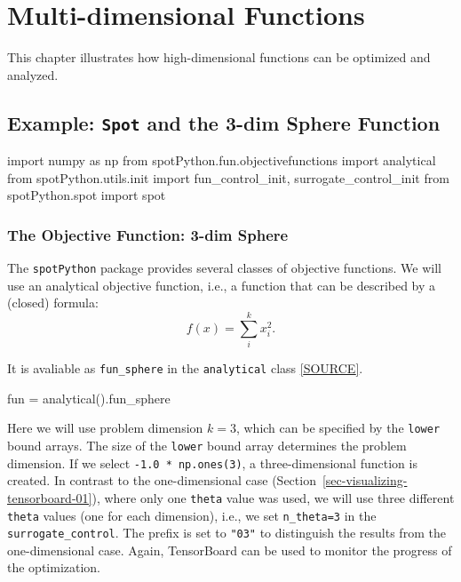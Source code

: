 \documentclass[
  letterpaper,
  DIV=11,
  numbers=noendperiod]{scrreprt}
\newenvironment{Shaded}{\begin{snugshade}}{\end{snugshade}}
\newcommand{\ImportTok}[1]{\textcolor[rgb]{0.00,0.46,0.62}{#1}}
\newcommand{\NormalTok}[1]{\textcolor[rgb]{0.00,0.23,0.31}{#1}}
\newcommand{\OperatorTok}[1]{\textcolor[rgb]{0.37,0.37,0.37}{#1}}
\begin{document}
\chapter{Multi-dimensional Functions}\label{sec-multi-dim}

This chapter illustrates how high-dimensional functions can be optimized
and analyzed.

\section{\texorpdfstring{Example: \texttt{Spot} and the 3-dim Sphere
Function}{Example: Spot and the 3-dim Sphere Function}}\label{example-spot-and-the-3-dim-sphere-function}

\begin{Shaded}
\begin{Highlighting}[]
\ImportTok{import}\NormalTok{ numpy }\ImportTok{as}\NormalTok{ np}
\ImportTok{from}\NormalTok{ spotPython.fun.objectivefunctions }\ImportTok{import}\NormalTok{ analytical}
\ImportTok{from}\NormalTok{ spotPython.utils.init }\ImportTok{import}\NormalTok{ fun\_control\_init, surrogate\_control\_init}
\ImportTok{from}\NormalTok{ spotPython.spot }\ImportTok{import}\NormalTok{ spot}
\end{Highlighting}
\end{Shaded}

\subsection{The Objective Function: 3-dim
Sphere}\label{the-objective-function-3-dim-sphere}

The \texttt{spotPython} package provides several classes of objective
functions. We will use an analytical objective function, i.e., a
function that can be described by a (closed) formula: \[
f(x) = \sum_i^k x_i^2.
\]

It is avaliable as \texttt{fun\_sphere} in the \texttt{analytical} class
\href{https://github.com/sequential-parameter-optimization/spotPython/blob/main/src/spotPython/fun/objectivefunctions.py}{{[}SOURCE{]}}.

\begin{Shaded}
\begin{Highlighting}[]
\NormalTok{fun }\OperatorTok{=}\NormalTok{ analytical().fun\_sphere}
\end{Highlighting}
\end{Shaded}

Here we will use problem dimension \(k=3\), which can be specified by
the \texttt{lower} bound arrays. The size of the \texttt{lower} bound
array determines the problem dimension. If we select
\texttt{-1.0\ *\ np.ones(3)}, a three-dimensional function is created.
In contrast to the one-dimensional case
(Section~\ref{sec-visualizing-tensorboard-01}), where only one
\texttt{theta} value was used, we will use three different
\texttt{theta} values (one for each dimension), i.e., we set
\texttt{n\_theta=3} in the \texttt{surrogate\_control}. The prefix is
set to \texttt{"03"} to distinguish the results from the one-dimensional
case. Again, TensorBoard can be used to monitor the progress of the
optimization.
\end{document}
